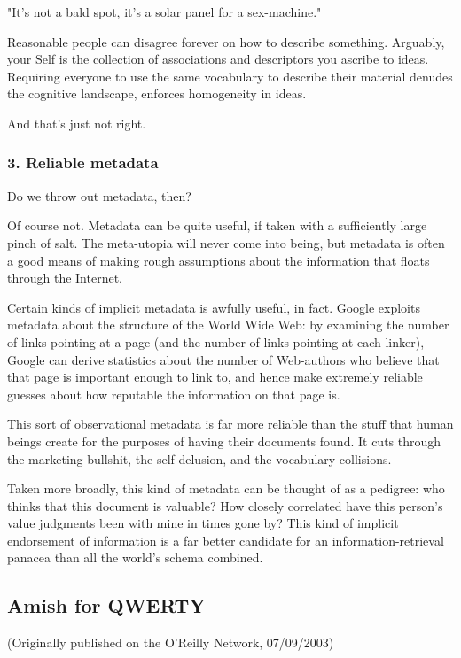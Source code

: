 "It's not a bald spot, it's a solar panel for a sex-machine."

Reasonable people can disagree forever on how to describe
something. Arguably, your Self is the collection of associations
and descriptors you ascribe to ideas. Requiring everyone to use the
same vocabulary to describe their material denudes the cognitive
landscape, enforces homogeneity in ideas.

And that's just not right.

\subsubsection{3. Reliable metadata}

Do we throw out metadata, then?

Of course not. Metadata can be quite useful, if taken with a
sufficiently large pinch of salt. The meta-utopia will never come
into being, but metadata is often a good means of making rough
assumptions about the information that floats through the
Internet.

Certain kinds of implicit metadata is awfully useful, in fact.
Google exploits metadata about the structure of the World Wide Web:
by examining the number of links pointing at a page (and the number
of links pointing at each linker), Google can derive statistics
about the number of Web-authors who believe that that page is
important enough to link to, and hence make extremely reliable
guesses about how reputable the information on that page is.

This sort of observational metadata is far more reliable than the
stuff that human beings create for the purposes of having their
documents found. It cuts through the marketing bullshit, the
self-delusion, and the vocabulary collisions.

Taken more broadly, this kind of metadata can be thought of as a
pedigree: who thinks that this document is valuable? How closely
correlated have this person's value judgments been with mine in
times gone by? This kind of implicit endorsement of information is
a far better candidate for an information-retrieval panacea than
all the world's schema combined.

\subsection{Amish for QWERTY}

(Originally published on the O'Reilly Network, 07/09/2003)

